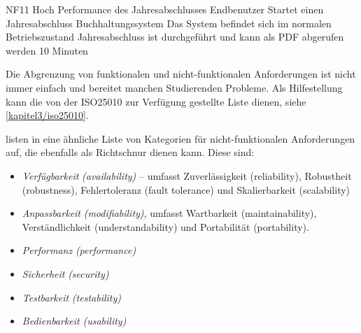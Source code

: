 \qas %
   {NF11} %
   {Hoch} %
   {Performance des Jahresabschlusses} %
   {Endbenutzer} %
   {Startet einen Jahresabschluss} %
   {Buchhaltungssystem} %
   {Das System befindet sich im normalen Betriebszustand} %
   {Jahresabschluss ist durchgeführt und kann als PDF abgerufen werden} %
   {10 Minuten} %

Die Abgrenzung von funktionalen und nicht-funktionalen Anforderungen ist nicht immer einfach und bereitet manchen Studierenden Probleme. Als Hilfestellung kann die von der ISO25010 \autocite{ISO25010} zur Verfügung gestellte Liste dienen, siehe \autoref{kapitel3/iso25010}.


\citeauthor{Bass2003} listen in \autocite{Bass2003} eine ähnliche Liste von Kategorien für nicht-funktionalen Anforderungen auf, die ebenfalls als Richtschnur dienen kann. Diese sind:

\begin{itemize}
  \item \textit{Verfügbarkeit} \textit{(availability)} -- umfasst Zuverlässigkeit (reliability), Robustheit (robustness), Fehlertoleranz (fault tolerance) und Skalierbarkeit (scalability)
  \item \textit{Anpassbarkeit} \textit{(modifiability)}, umfasst Wartbarkeit (maintainability), Verständlichkeit (understandability) und Portabilität (portability).
  \item \textit{Performanz} \textit{(performance)}
  \item \textit{Sicherheit} \textit{(security)}
  \item \textit{Testbarkeit} \textit{(testability)}
  \item \textit{Bedienbarkeit} \textit{(usability)}
\end{itemize}

